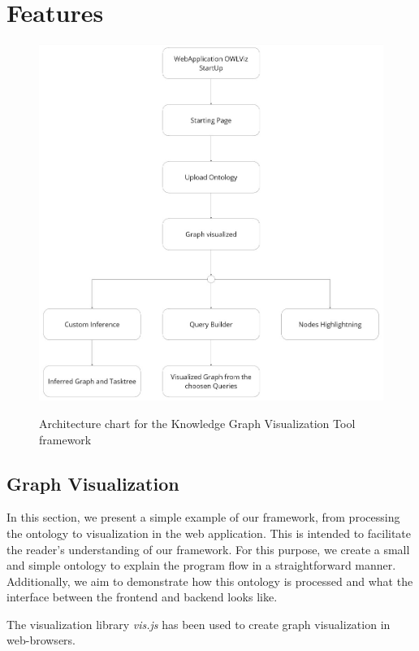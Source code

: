 \section{Features}

\begin{figure}[H]
    \includegraphics[scale=0.35]{Graphics/architecture_simplified.jpg}
    \label{fig:OWLViz_architecture}
    \caption{Architecture chart for the Knowledge Graph Visualization Tool framework}
\end{figure}

\subsection{Graph Visualization}
In this section, we present a simple example of our framework, from processing the ontology to visualization in the web application. 
This is intended to facilitate the reader's understanding of our framework. 
For this purpose, we create a small and simple ontology to explain the program flow in a straightforward manner. 
Additionally, we aim to demonstrate how this ontology is processed and what the interface between the frontend and backend looks like.

The visualization library \textit{vis.js} \cite{visjs} has been used to create graph visualization in web-browsers.

